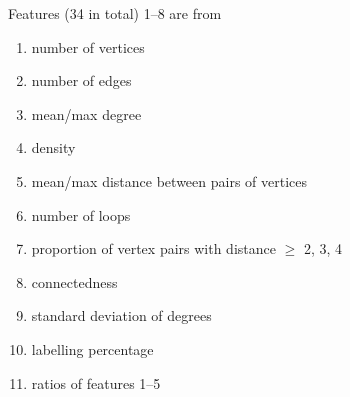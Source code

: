 \documentclass{beamer}
\begin{document}

\begin{frame}{Features (34 in total)}
  1--8 are from \cite{DBLP:conf/lion/KotthoffMS16}
  \begin{enumerate}
  \item number of vertices
  \item number of edges
  \item mean/max degree
  \item density
  \item mean/max distance between pairs of vertices
  \item number of loops
  \item proportion of vertex pairs with distance $\ge$ 2, 3, 4
  \item connectedness
    \pause
  \item standard deviation of degrees
  \item labelling percentage
    \pause
  \item ratios of features 1--5
  \end{enumerate}
\end{frame}


\end{document}
